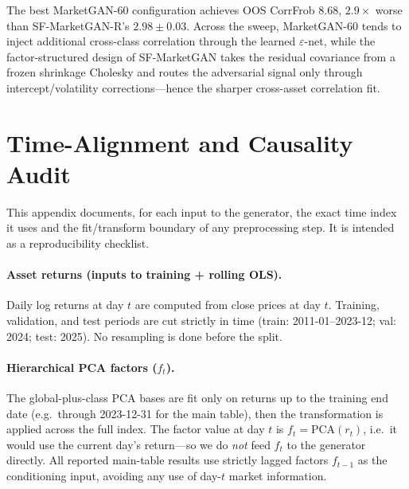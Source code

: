 The best MarketGAN-60 configuration achieves OOS CorrFrob $8.68$, $2.9\times$ worse than SF-MarketGAN-R's $2.98 \pm 0.03$. Across the sweep, MarketGAN-60 tends to inject additional cross-class correlation through the learned $\varepsilon$-net, while the factor-structured design of SF-MarketGAN takes the residual covariance from a frozen shrinkage Cholesky and routes the adversarial signal only through intercept/volatility corrections---hence the sharper cross-asset correlation fit.

\section{Time-Alignment and Causality Audit}
\label{app:leakage_audit}

This appendix documents, for each input to the generator, the exact time index it uses and the fit/transform boundary of any preprocessing step. It is intended as a reproducibility checklist.

\paragraph{Asset returns (inputs to training + rolling OLS).}
Daily log returns at day $t$ are computed from close prices at day $t$. Training, validation, and test periods are cut strictly in time (train: 2011-01--2023-12; val: 2024; test: 2025). No resampling is done before the split.

\paragraph{Hierarchical PCA factors ($f_t$).}
The global-plus-class PCA bases are fit only on returns up to the training end date (e.g.\ through 2023-12-31 for the main table), then the transformation is applied across the full index. The factor value at day $t$ is $f_t = \text{PCA}(r_t)$, i.e.\ it would use the current day's return---so we do \emph{not} feed $f_t$ to the generator directly. All reported main-table results use strictly lagged factors $f_{t-1}$ as the conditioning input, avoiding any use of day-$t$ market information.

